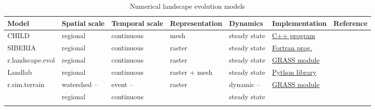 \documentclass[gmd, manuscript]{copernicus}
\begin{document}
\begin{table}
\small
\caption{Numerical landscape evolution models}
\begin{tabu} to \textwidth {XXXXXll}
\toprule
Model & Spatial scale &  Temporal scale & Representation & Dynamics & Implementation & Reference\\
\midrule
CHILD & regional & continuous & mesh & steady state & \href{https://csdms.colorado.edu/wiki/Model:CHILD}{C++ program} & \citep{Tucker2001}\\
SIBERIA & regional & continuous & raster & steady state & \href{https://csdms.colorado.edu/wiki/Model:SIBERIA}{Fortran prog.} & \citep{Willgoose2005}\\
r.landscape.evol  & regional & continuous & raster &  steady state & \href{https://grass.osgeo.org/grass74/manuals/addons/r.landscape.evol.html}{GRASS module} & \citep{Barton2010}\\
Landlab & regional & continuous & raster + mesh & steady state & \href{https://github.com/landlab/}{Python library} & \citep{Hobley2017}\\
r.sim.terrain & watershed -- & event -- & raster & dynamic -- & \href{https://github.com/baharmon/landscape_evolution}{GRASS module} &\\ %
& regional & continuous && steady state & &\\
\bottomrule
\\
\end{tabu}
\label{table:evolution_models} 
\end{table}

\end{document}
